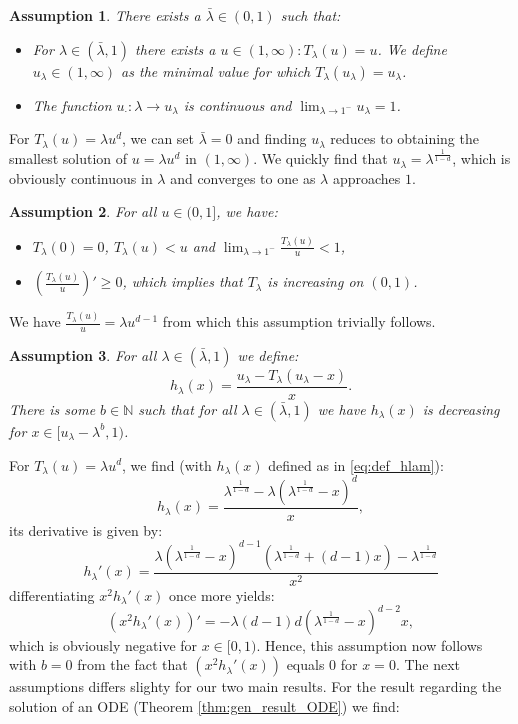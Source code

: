 \documentclass[12pt]{report}
\newtheorem{assumption}{Assumption}
\begin{document}
\begin{assumption}\label{item:existulam}
There exists a $\bar \lambda \in (0,1)$ such that:
\begin{itemize}
\item For $\lambda\in (\bar \lambda, 1)$ there exists a $u \in (1,\infty): T_\lambda(u) = u$. We define $u_\lambda \in (1,\infty)$ as the minimal value for which $T_\lambda(u_\lambda) = u_\lambda$.
\item The function $u_\cdot : \lambda \rightarrow u_\lambda$ is continuous and $\lim_{\lambda \rightarrow 1^-} u_\lambda = 1$.
\end{itemize}
\end{assumption}
For $T_\lambda(u)=\lambda u^d$, we can set $\bar \lambda = 0$ and
finding $u_\lambda$ reduces to obtaining the smallest solution 
of $u = \lambda u^d$ in $(1,\infty)$. We quickly find that $
u_\lambda = \lambda^{\frac{1}{1-d}}$, which is obviously 
continuous in $\lambda$  and converges to one as $\lambda$ approaches $1$.
\begin{assumption}\label{item:Tu_smaller_u}
For all $u \in (0,1]$, we have:
\begin{itemize}
\item $T_\lambda(0) = 0$, $T_\lambda(u) < u$ and $\lim_{\lambda\rightarrow 1^-} \frac{T_\lambda(u)}{u} < 1$,
\item $\left( \frac{T_\lambda(u)}{u} \right) ' \geq 0$, which implies that $T_\lambda$ is increasing on $(0,1)$.
\end{itemize}
\end{assumption}
We have $\frac{T_\lambda(u)}{u} = \lambda u^{d-1}$ from which this assumption trivially follows.

\begin{assumption} \label{item:h_decreasing}
For all $\lambda \in ( \bar \lambda, 1)$ we define:
\begin{equation}\label{eq:def_hlam}
h_\lambda(x) = \frac{u_\lambda - T_\lambda(u_\lambda - x)}{x}.
\end{equation}
There is some $b \in \mathbb{N}$ such that for all $\lambda \in (\bar \lambda,1)$ we have $h_\lambda(x)$ is decreasing for $x \in [u_\lambda - \lambda^b,1)$.
\end{assumption}

For $T_\lambda(u) = \lambda u^d$, we find (with $h_\lambda(x)$ defined as in \eqref{eq:def_hlam}):
\begin{equation}\label{eq:hlam_LLd}
h_{\lambda}(x)
=
\frac{\lambda^{\frac{1}{1-d}} - \lambda (\lambda^{\frac{1}{1-d}} - x)^d }{x},
\end{equation}
its derivative is given by:
$$
h_\lambda'(x)
=
\frac{\lambda \left(\lambda^{\frac{1}{1-d}}-x\right)^{d-1} \left(\lambda^{\frac{1}{1-d}}+(d-1)
   x\right)-\lambda^{\frac{1}{1-d}}}{x^2}
$$
differentiating $x^2 h_\lambda'(x)$ once more yields:
$$
(x^2 h_\lambda'(x))'=-\lambda(d-1)d\left(\lambda^{\frac{1}{1-d}} -x \right)^{d-2} x,
$$
which is obviously negative for $x \in [0,1)$. Hence, this assumption now follows with $b=0$ from the fact that $(x^2 h_\lambda'(x))$ equals $0$ for $x=0$. The next assumptions differs slighty for our two main results. For the result regarding the solution of an ODE (Theorem \ref{thm:gen_result_ODE}) we find:
\end{document}
